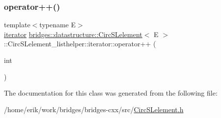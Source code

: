 \subsubsection{\texorpdfstring{operator++()}{operator++()}\hspace{0.1cm}{\footnotesize\ttfamily [2/2]}}
{\footnotesize\ttfamily template$<$typename E$>$ \\
\hyperlink{classbridges_1_1datastructure_1_1_circ_s_lelement_1_1_circ_s_lelement__listhelper_1_1iterator}{iterator} \hyperlink{classbridges_1_1datastructure_1_1_circ_s_lelement}{bridges\+::datastructure\+::\+Circ\+S\+Lelement}$<$ E $>$\+::Circ\+S\+Lelement\+\_\+listhelper\+::iterator\+::operator++ (\begin{DoxyParamCaption}\item[{int}]{ }\end{DoxyParamCaption})\hspace{0.3cm}{\ttfamily [inline]}}



The documentation for this class was generated from the following file\+:\begin{DoxyCompactItemize}
\item 
/home/erik/work/bridges/bridges-\/cxx/src/\hyperlink{_circ_s_lelement_8h}{Circ\+S\+Lelement.\+h}\end{DoxyCompactItemize}
